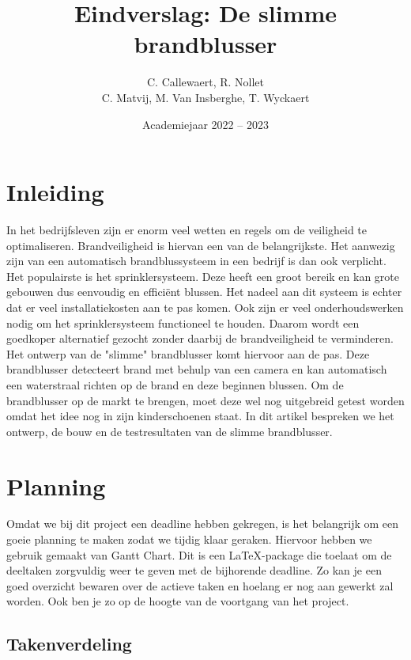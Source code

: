 \documentclass{kulakarticle}
\title{Eindverslag: De slimme brandblusser}
\author{C. Callewaert, R. Nollet \\
	 C. Matvij, M. Van Insberghe, T. Wyckaert }
\date{Academiejaar 2022 -- 2023}
\begin{document}
	
\maketitle

\tableofcontents
	
\section*{Inleiding}

In het bedrijfsleven zijn er enorm veel wetten en regels om de veiligheid te optimaliseren. Brandveiligheid is hiervan een van de belangrijkste. Het aanwezig zijn van een automatisch brandblussysteem in een bedrijf is dan ook verplicht. Het populairste is het sprinklersysteem. Deze heeft een groot bereik en kan grote gebouwen dus eenvoudig en efficiënt blussen. Het nadeel aan dit systeem is echter dat er veel installatiekosten aan te pas komen. Ook zijn er veel onderhoudswerken nodig om het sprinklersysteem functioneel te houden. Daarom wordt een goedkoper alternatief gezocht zonder daarbij de brandveiligheid te verminderen. Het ontwerp van de "slimme" brandblusser komt hiervoor aan de pas. Deze brandblusser detecteert brand met behulp van een camera en kan automatisch een waterstraal richten op de brand en deze beginnen blussen. Om  de brandblusser op de markt te brengen, moet deze wel nog uitgebreid getest worden omdat het idee nog in zijn kinderschoenen staat. In dit artikel bespreken we het ontwerp, de bouw en de testresultaten van de slimme brandblusser. 

\section{Planning}

Omdat we bij dit project een deadline hebben gekregen, is het belangrijk om een goeie planning te maken zodat we tijdig klaar geraken. Hiervoor hebben we gebruik gemaakt van Gantt Chart. Dit is een \LaTeX-package die toelaat om de deeltaken zorgvuldig weer te geven met de bijhorende deadline. Zo kan je een goed overzicht bewaren over de actieve taken en hoelang er nog aan gewerkt zal worden. Ook ben je zo op de hoogte van de voortgang van het project.

\subsection{Takenverdeling}
\end{document}
